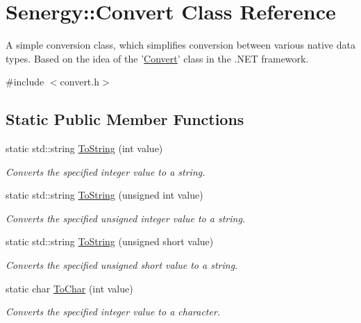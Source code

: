\hypertarget{class_senergy_1_1_convert}{\section{Senergy\-:\-:Convert Class Reference}
\label{class_senergy_1_1_convert}
}


A simple conversion class, which simplifies conversion between various native data types. Based on the idea of the '\hyperlink{class_senergy_1_1_convert}{Convert}' class in the .N\-E\-T framework.  




{\ttfamily \#include $<$convert.\-h$>$}

\subsection*{Static Public Member Functions}
\begin{DoxyCompactItemize}
\item 
static std\-::string \hyperlink{class_senergy_1_1_convert_a80cf7b84b0ff65171da68ca40cbf817f}{To\-String} (int value)
\begin{DoxyCompactList}\small\item\em Converts the specified integer value to a string. \end{DoxyCompactList}\item 
static std\-::string \hyperlink{class_senergy_1_1_convert_ac468bf5d893e3437883763d8457adc1c}{To\-String} (unsigned int value)
\begin{DoxyCompactList}\small\item\em Converts the specified unsigned integer value to a string. \end{DoxyCompactList}\item 
static std\-::string \hyperlink{class_senergy_1_1_convert_a14a9a727adf896d752b604d82d4d8164}{To\-String} (unsigned short value)
\begin{DoxyCompactList}\small\item\em Converts the specified unsigned short value to a string. \end{DoxyCompactList}\item 
static char \hyperlink{class_senergy_1_1_convert_a66c09e2b461268212cc384e71a2f57c6}{To\-Char} (int value)
\begin{DoxyCompactList}\small\item\em Converts the specified integer value to a character. \end{DoxyCompactList}\end{DoxyCompactItemize}


